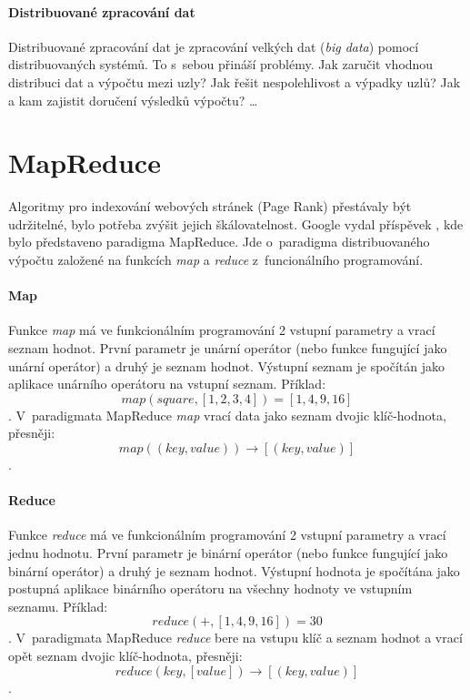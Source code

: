 \paragraph*{Distribuované zpracování dat} Distribuované zpracování dat je zpracování velkých dat (\textit{big data}) pomocí distribuovaných systémů. To s~sebou přináší problémy. Jak zaručit vhodnou distribuci dat a výpočtu mezi uzly? Jak řešit nespolehlivost a výpadky uzlů? Jak a kam zajistit doručení výsledků výpočtu? \dots


\section{MapReduce}

Algoritmy pro indexování webových stránek (Page Rank) přestávaly být udržitelné, bylo potřeba zvýšit jejich škálovatelnost. Google vydal příspěvek , kde bylo představeno paradigma MapReduce. Jde o~paradigma distribuovaného výpočtu založené na funkcích \textit{map} a \textit{reduce} z~funcionálního programování.

\paragraph*{Map} Funkce \textit{map} má ve funkcionálním programování 2 vstupní parametry a vrací seznam hodnot. První parametr je unární operátor (nebo funkce fungující jako unární operátor) a druhý je seznam hodnot. Výstupní seznam je spočítán jako aplikace unárního operátoru na vstupní seznam. Příklad:
$$
map(square, [1, 2, 3, 4]) = [1, 4, 9, 16]
$$.
V~paradigmata MapReduce \textit{map} vrací data jako seznam dvojic klíč-hodnota, přesněji: $$
map((key, value)) \rightarrow [(key, value)]
$$.

\paragraph*{Reduce} Funkce \textit{reduce} má ve funkcionálním programování 2 vstupní parametry a vrací jednu hodnotu. První parametr je binární operátor (nebo funkce fungující jako binární operátor) a druhý je seznam hodnot. Výstupní hodnota je spočítána jako postupná aplikace binárního operátoru na všechny hodnoty ve vstupním seznamu. Příklad:
$$
reduce(+, [1, 4, 9, 16]) = 30
$$.
V~paradigmata MapReduce \textit{reduce} bere na vstupu klíč a seznam hodnot a vrací opět seznam dvojic klíč-hodnota, přesněji: $$
reduce(key, [value]) \rightarrow [(key, value)]
$$.

